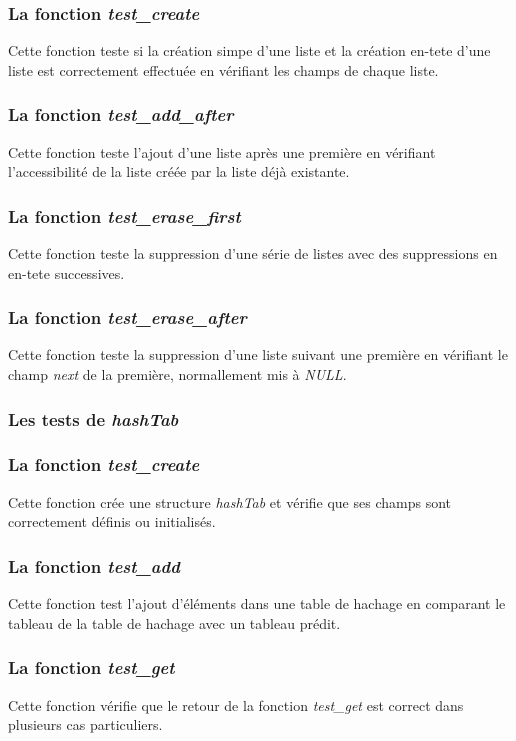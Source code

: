 \documentclass{report}
\begin{document}
\subsubsection*{La fonction \textit{test\_create}}
Cette fonction teste si la création simpe d'une liste et la création en-tete d'une liste est correctement effectuée en vérifiant les champs de chaque liste.
\subsubsection*{La fonction \textit{test\_add\_after}}
Cette fonction teste l'ajout d'une liste après une première en vérifiant l'accessibilité de la liste créée par la liste déjà existante.
\subsubsection*{La fonction \textit{test\_erase\_first}}
Cette fonction teste la suppression d'une série de listes avec des suppressions en en-tete successives.
\subsubsection*{La fonction \textit{test\_erase\_after}}
Cette fonction teste la suppression d'une liste suivant une première en vérifiant le champ \textit{next} de la première, normallement mis à \textit{NULL}.
\subsubsection{Les tests de \textit{hashTab}}
\subsubsection*{La fonction \textit{test\_create}}
Cette fonction crée une structure \textit{hashTab} et vérifie que ses champs sont correctement définis ou initialisés.
\subsubsection*{La fonction \textit{test\_add}}
Cette fonction test l'ajout d'éléments dans une table de hachage en comparant le tableau de la table de hachage avec un tableau prédit.
\subsubsection*{La fonction \textit{test\_get}}
Cette fonction vérifie que le retour de la fonction \textit{test\_get} est correct dans plusieurs cas particuliers.
\end{document}
